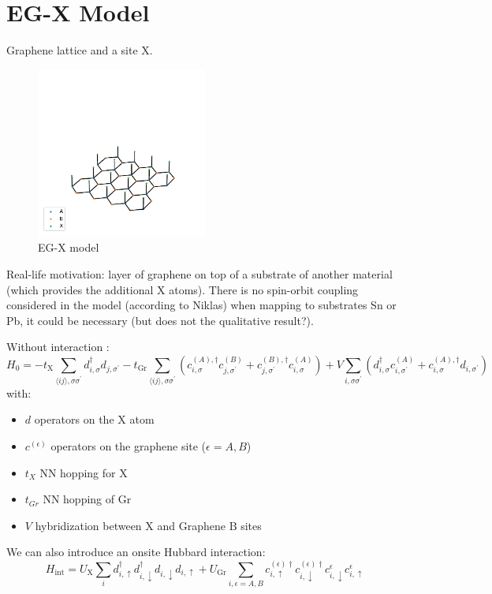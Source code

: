 \section{EG-X Model}\label{sec:eg-x-model}

Graphene lattice and a site X\@.
\begin{figure}[htb]
    \centering
    \includegraphics[width=0.5\textwidth]{images/eg-x lattice}
    \caption{EG-X model}
    \label{fig:eg-x model}
\end{figure}
Real-life motivation: layer of graphene on top of a substrate of another material (which provides the additional X atoms).
There is no spin-orbit coupling considered in the model (according to Niklas) when mapping to substrates Sn or Pb, it could be necessary (but does not the qualitative result?).

Without interaction :
\begin{equation}
    H_0 = -t_{\mathrm{X}} \sum_{\langle ij \rangle, \sigma \sigma^{\prime}} d_{i, \sigma}^{\dagger} d_{j, \sigma^{\prime}}
    -t_{\mathrm{Gr}} \sum_{\langle ij \rangle, \sigma \sigma^{\prime}} \left(
    c_{i, \sigma}^{(A), \dagger} c_{j, \sigma^{\prime}}^{(B)} +
    c_{j, \sigma^{\prime}}^{(B), \dagger} c_{i, \sigma}^{(A)}
    \right)
    + V \sum_{i, \sigma \sigma^{\prime}} \left(
    d_{i, \sigma}^{\dagger} c_{i, \sigma^{\prime}}^{(A)} +
    c_{i, \sigma}^{(A), \dagger} d_{i, \sigma^{\prime}}
    \right)
    \label{eq:EG-X model Hamiltonian non-interacting}
\end{equation}
with:
\begin{itemize}
    \item \(d\) operators on the X atom
    \item \(c^{(\epsilon)}\) operators on the graphene site (\(\epsilon = A, B\))
    \item \(t_X\) NN hopping for X
    \item \(t_{Gr}\) NN hopping of Gr
    \item \(V\) hybridization between \(\mathrm{X}\) and Graphene \(\mathrm{B}\) sites
\end{itemize}
We can also introduce an onsite Hubbard interaction:
\begin{equation}
    H_{\mathrm{int}} = U_{\mathrm{X}} \sum_{i} d_{i, \uparrow}^{\dagger} d_{i, \downarrow}^{\dagger} d_{i, \downarrow} d_{i, \uparrow}
    + U_{\mathrm{Gr}} \sum_{i, \epsilon=A, B} c_{i, \uparrow}^{(\epsilon) \dagger} c_{i, \downarrow}^{(\epsilon) \dagger} c_{i, \downarrow}^{\epsilon} c_{i, \uparrow}^{\epsilon}
\end{equation}

